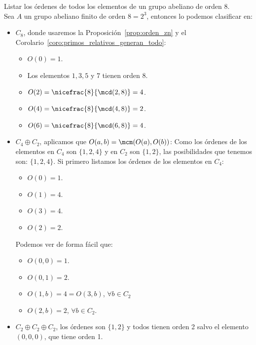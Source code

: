 \begin{ejemplo} %
    Listar los órdenes de todos los elementos de un grupo abeliano de orden 8.\\

    \noindent
    Sea $A$ un grupo abeliano finito de orden $8 = 2^3$, entonces lo podemos clasificar en:
    \begin{itemize}
        \item $C_8$, donde usaremos la Proposición~\ref{prop:orden_zn} y el Corolario~\ref{coro:primos_relativos_generan_todo}:
            \begin{itemize}
                \item $O(0) = 1$.
                \item Los elementos $1,3,5$ y $7$ tienen orden 8.
                \item $O(2) = \nicefrac{8}{\mcd(2,8)} = 4$.
                \item $O(4) = \nicefrac{8}{\mcd(4,8)} = 2$.
                \item $O(6) = \nicefrac{8}{\mcd(6,8)} = 4$.
            \end{itemize}
        \item $C_4\oplus C_2$, aplicamos que $O(a,b) = \mcm(O(a), O(b))$:
            Como los órdenes de los elementos en $C_4$ son $\{1,2,4\}$ y en $C_2$ son $\{1,2\}$, las posibilidades que tenemos son: $\{1,2,4\}$. Si primero listamos los órdenes de los elementos en $C_4$:
            \begin{itemize}
                \item $O(0) = 1$.
                \item $O(1) = 4$.
                \item $O(3) = 4$.
                \item $O(2) = 2$.
            \end{itemize}
            Podemos ver de forma fácil que:
            \begin{itemize}
                \item $O(0,0) = 1$.
                \item $O(0,1) = 2$.
                \item $O(1,b) = 4 = O(3,b)$, $\forall b\in C_2$
                \item $O(2,b) = 2 $, $\forall b\in C_2$.
            \end{itemize}
        \item $C_2\oplus C_2\oplus C_2$, los órdenes son $\{1,2\}$ y todos tienen orden 2 salvo el elemento $(0,0,0)$, que tiene orden 1.
    \end{itemize}
\end{ejemplo}

